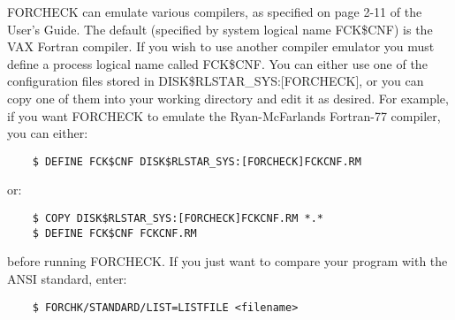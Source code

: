 \documentclass[11pt,twoside]{article}
\begin{document}
FORCHECK can emulate various compilers, as specified on page 2-11 of the
User's Guide.
The default (specified by system logical name FCK\$CNF) is the VAX Fortran
compiler.
If you wish to use another compiler emulator you must define a process
logical name called FCK\$CNF.
You can either use one of the configuration files stored in
DISK\$RLSTAR\_SYS:[FORCHECK], or you can copy one of them into your working
directory and edit it as desired.
For example, if you want FORCHECK to emulate the Ryan-McFarlands
Fortran-77 compiler, you can either:
\begin{verbatim}
    $ DEFINE FCK$CNF DISK$RLSTAR_SYS:[FORCHECK]FCKCNF.RM
\end{verbatim}
or:
\begin{verbatim}
    $ COPY DISK$RLSTAR_SYS:[FORCHECK]FCKCNF.RM *.*
    $ DEFINE FCK$CNF FCKCNF.RM
\end{verbatim}
before running FORCHECK.
If you just want to compare your program with the ANSI standard, enter:
\begin{verbatim}
    $ FORCHK/STANDARD/LIST=LISTFILE <filename>
\end{verbatim}
\end{document}
